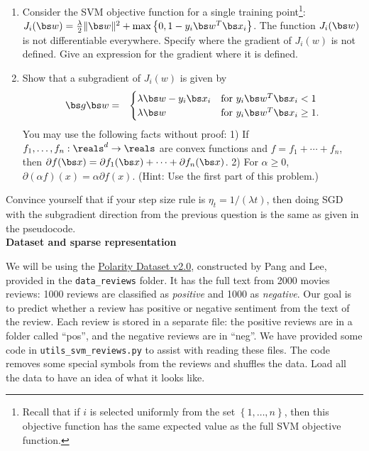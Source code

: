 \documentclass{article}
\newcommand{\wipcom}[1]{\textcolor{red}{WIP: #1}}
\newcommand{\nyuparagraph}[1]{\textcolor{nyupurple}{\large #1}}
\theoremstyle{plain}
\theoremstyle{definition}
\begin{document}
\begin{enumerate}
  \setcounter{enumi}{\value{saveenum}}
\item Consider the SVM objective function for a single training point\footnote{Recall that if $i$ is selected uniformly from the set $\left\{ 1,\ldots,n\right\} $,
then this objective function has the same expected value
as the full SVM objective function.}: $J_{i}(\bs w)=\frac{\lambda}{2}\|\bs w\|^{2}+\max\left\{ 0,1-y_{i}\bs w^{T}\bs x_{i}\right\} $.
The function $J_{i}(\bs w)$ is not differentiable everywhere. Specify where the gradient of $J_{i}(w)$ is not defined. Give an expression for the gradient where it is defined.\\

\item Show that a subgradient of $J_{i}(w)$ is given by 
\begin{eqnarray*}
\bs g{\bs w} & = & \begin{cases}
\lambda \bs w-y_{i}\bs x_{i} & \mbox{for }y_{i}\bs w^{T}\bs x_{i}<1\\
\lambda \bs w & \mbox{for }y_{i}\bs w^{T}\bs x_{i}\ge1.
\end{cases}
\end{eqnarray*}
You may use the following facts without proof: 1) If $f_{1},\ldots,f_{n}:\reals^{d}\to\reals$
are convex functions and $f=f_{1}+\cdots+f_{n}$, then $\partial f(\bs x)=\partial f_{1}(\bs x)+\cdots+\partial f_{n}(\bs x)$.
2) For $\alpha\ge0$, $\partial\left(\alpha f\right)(x)=\alpha\partial f(x)$.
(Hint: Use the 
first part of this problem.)
\setcounter{saveenum}{\value{enumi}}
\end{enumerate}

Convince yourself that if your step size rule is $\eta_{t}=1/\left(\lambda t\right)$,
then doing SGD with the subgradient direction from the previous question
is the same as given in the pseudocode. \\


\nyuparagraph{\bf Dataset and sparse representation} 

We will be using the \href{https://www.cs.cornell.edu/people/pabo/movie-review-data/}{Polarity Dataset v2.0},
constructed by Pang and Lee, provided in the \texttt{data\_reviews} folder. It has the full text from 2000 movies
reviews: 1000 reviews are classified as \emph{positive} and 1000 as
\emph{negative}. Our goal is to predict whether a review has positive
or negative sentiment from the text of the review. Each review is
stored in a separate file: the positive reviews are in a folder called
``pos'', and the negative reviews are in ``neg''. We have provided
some code in \texttt{utils\_svm\_reviews.py} to assist with reading these files.
The code removes
some special symbols from the reviews and shuffles the data.
Load all the data to have an idea of what it looks like.
\end{document}
